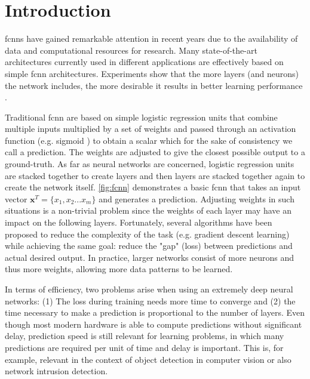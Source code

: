 \documentclass[conference]{IEEEtran}
\begin{document}
\section{Introduction}
\glspl{fcnn} have gained remarkable attention in recent years due to the availability of data and computational resources for research. Many state-of-the-art architectures currently used in different applications are effectively based on simple \gls{fcnn} architectures. Experiments show that the more layers (and neurons) the network includes, the more desirable it results in better learning performance \cite{eldan_power_2016}.

Traditional \gls{fcnn} are based on simple logistic regression units that combine multiple inputs multiplied by a set of weights and passed through an activation function (e.g. sigmoid \cite{noauthor_sigmoid_2020}) to obtain a scalar which for the sake of consistency we call a prediction. The weights are adjusted to give the closest possible output to a ground-truth. As far as neural networks are concerned, logistic regression units are stacked together to create layers and then layers are stacked together again to create the network itself. \autoref{fig:fcnn} demonstrates a basic \gls{fcnn} that takes an input vector $\textbf{x}^{T} = \lbrace x_{1}, x_{2} ... x_{m} \rbrace$ and generates a prediction. Adjusting weights in such situations is a non-trivial problem since the weights of each layer may have an impact on the following layers. Fortunately, several algorithms have been proposed to reduce the complexity of the task (e.g. gradient descent learning) while achieving the same goal: reduce the "gap" (loss) between predictions and actual desired output. In practice, larger networks consist of more neurons and thus more weights, allowing more data patterns to be learned.

In terms of efficiency, two problems arise when using an extremely deep neural networks: (1) The loss during training needs more time to converge and (2) the time necessary to make a prediction is proportional to the number of layers. Even though most modern hardware is able to compute predictions without significant delay, prediction speed is still relevant for learning problems, in which many predictions are required per unit of time and delay is important. This is, for example, relevant in the context of object detection in computer vision or also network intrusion detection. 
\end{document}
